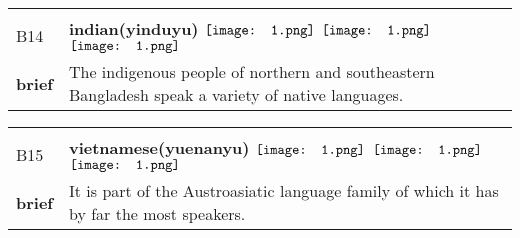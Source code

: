 \documentclass[UTF8]{article}
\begin{document}
            \begin{tabularx}{\textwidth}{p{1.5cm}X}
            \arrayrulecolor{myBlue}
        	\hline\\
            \small{B14}&
            \large{\bfseries{indian(yinduyu)}}\hfill
                                                            \phantom{$\vcenter{\hbox{\texttt{[image: 1.png]}}}$}
                                                                \phantom{$\vcenter{\hbox{\texttt{[image: 1.png]}}}$}
                                                                $\vcenter{\hbox{\texttt{[image: 1.png]}}}$
                                                                \phantom{$\vcenter{\hbox{\texttt{[image: 1.png]}}}$}
                                                                \phantom{$\vcenter{\hbox{\texttt{[image: 1.png]}}}$}
                                                                $\vcenter{\hbox{\texttt{[image: 1.png]}}}$
                                                                $\vcenter{\hbox{\texttt{[image: 1.png]}}}$
                                        \\[10pt]
            \large{\bfseries{brief}}&\noindent\parbox[c]{\hsize}{The indigenous people of northern and southeastern Bangladesh speak a variety of native languages.} \\[5pt]
            \hline\\[-10pt]
        \end{tabularx}
            \begin{tabularx}{\textwidth}{p{1.5cm}X}
            \arrayrulecolor{myBlue}
        	\hline\\
            \small{B15}&
            \large{\bfseries{vietnamese(yuenanyu)}}\hfill
                                                            \phantom{$\vcenter{\hbox{\texttt{[image: 1.png]}}}$}
                                                                \phantom{$\vcenter{\hbox{\texttt{[image: 1.png]}}}$}
                                                                $\vcenter{\hbox{\texttt{[image: 1.png]}}}$
                                                                \phantom{$\vcenter{\hbox{\texttt{[image: 1.png]}}}$}
                                                                \phantom{$\vcenter{\hbox{\texttt{[image: 1.png]}}}$}
                                                                $\vcenter{\hbox{\texttt{[image: 1.png]}}}$
                                                                $\vcenter{\hbox{\texttt{[image: 1.png]}}}$
                                        \\[10pt]
            \large{\bfseries{brief}}&\noindent\parbox[c]{\hsize}{It is part of the Austroasiatic language family of which it has by far the most speakers.} \\[5pt]
            \hline\\[-10pt]
        \end{tabularx}
\end{document}
